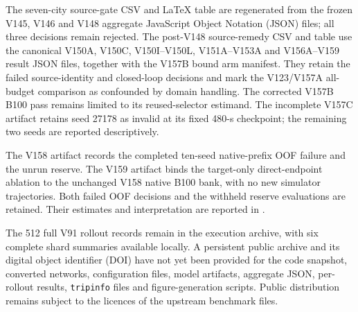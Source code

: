 The seven-city source-gate CSV and LaTeX table are regenerated from the frozen
V145, V146 and V148 aggregate JavaScript Object Notation (JSON) files; all
three decisions remain rejected.  The post-V148 source-remedy CSV and table
use the canonical V150A, V150C, V150I--V150L, V151A--V153A and V156A--V159
result JSON files, together with the V157B bound arm manifest.  They retain the
failed source-identity and closed-loop decisions and mark the V123/V157A
all-budget comparison as confounded by domain handling.  The corrected V157B
B100 pass remains limited to its reused-selector estimand.  The incomplete
V157C artifact retains seed 27178 as invalid at its fixed 480-s checkpoint;
the remaining two seeds are reported descriptively.

The V158 artifact records the completed ten-seed native-prefix OOF failure and
the unrun reserve.  The V159 artifact binds the target-only direct-endpoint
ablation to the unchanged V158 native B100 bank, with no new simulator
trajectories.  Both failed OOF decisions and the withheld reserve evaluations
are retained.  Their estimates and interpretation are reported in
.

The 512 full V91 rollout records remain in the execution archive, with six
complete shard summaries available locally.  A persistent public archive and
its digital object identifier (DOI) have not yet been provided for the code
snapshot, converted networks, configuration files, model artifacts, aggregate
JSON, per-rollout results, \texttt{tripinfo} files and figure-generation
scripts.  Public distribution remains subject to the licences of the upstream
benchmark files.
